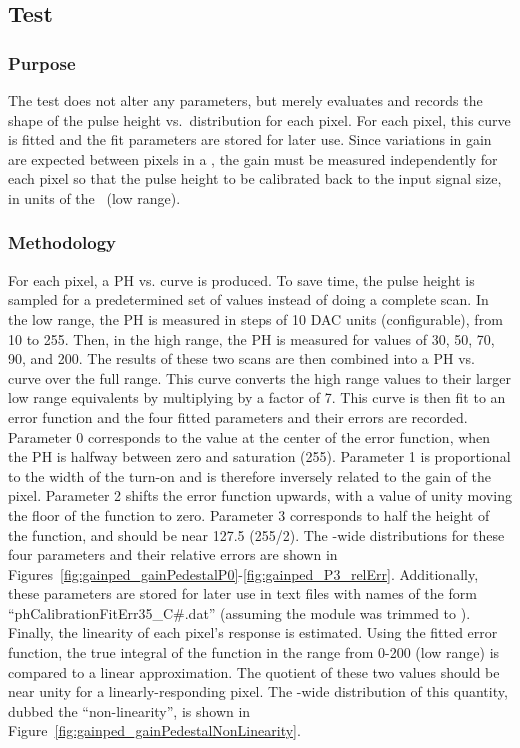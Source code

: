 
\newpage

\subsection{\gainped Test}
\label{ss:gainped}

\subsubsection{Purpose}

The \gainped test does not alter any \dac parameters,
but merely evaluates and records the shape of the pulse height vs.~\vcal distribution for each pixel.
For each pixel, this curve is fitted and the fit parameters are stored for later use.
Since variations in gain are expected between pixels in a \roc,
the gain must be measured independently for each pixel so that the pulse height to be calibrated back to the input signal size, 
in units of the \vcal~\dac (low range).

\subsubsection{Methodology}

For each pixel, a PH vs. \vcal curve is produced.
To save time, the pulse height is sampled for a predetermined set of \vcal values instead of doing a complete \vcal scan.
In the low \vcal range, the PH is measured in steps of 10 DAC units (configurable), from 10 to 255.
Then, in the high \vcal range, the PH is measured for values of 30, 50, 70, 90, and 200.
The results of these two scans are then combined into a PH vs. \vcal curve over the full \vcal range.
This curve converts the high range \vcal values to their larger low range equivalents by multiplying by a factor of 7.
This curve is then fit to an error function and the four fitted parameters and their errors are recorded.
Parameter 0 corresponds to the \vcal value at the center of the error function, when the PH is halfway between zero and saturation (255).
Parameter 1 is proportional to the width of the turn-on and is therefore inversely related to the gain of the pixel.
Parameter 2 shifts the error function upwards, with a value of unity moving the floor of the function to zero.
Parameter 3 corresponds to half the height of the function, and should be near 127.5 (255/2).
The \roc-wide distributions for these four parameters 
and their relative errors are shown in Figures~\ref{fig:gainped_gainPedestalP0}-\ref{fig:gainped_P3_relErr}.
Additionally, these parameters are stored for later use in text files with names of the form ``phCalibrationFitErr35\_C\#.dat''
(assuming the module was trimmed to ).
Finally, the linearity of each pixel's response is estimated.
Using the fitted error function, the true integral of the function in the \vcal range from 0-200 (low range) is compared to a linear approximation.
The quotient of these two values should be near unity for a linearly-responding pixel.
The \roc-wide distribution of this quantity, dubbed the ``non-linearity'', is shown in Figure~\ref{fig:gainped_gainPedestalNonLinearity}.

